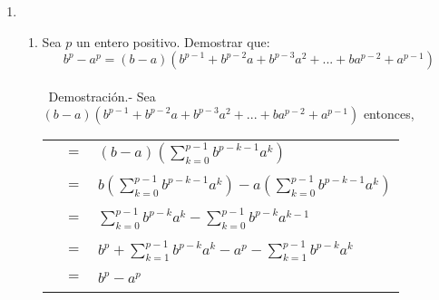 \begin{enumerate}[ \bfseries 1.]
\item 
\begin{enumerate}[\bfseries (a)]
\item Sea $p$ un entero positivo. Demostrar que:
$$b^p - a^p = (b-a)(b^{p-1} + b^{p-2}a + b^{p-3}a^2 + ... + ba^{p-2} + a^{p-1})$$\\\
Demostración.- \; Sea $(b-a)(b^{p-1} + b^{p-2}a + b^{p-3}a^2 + ... + ba^{p-2} + a^{p-1})$ entonces,
\begin{center}
\begin{tabular}{rcl}
&$=$&$(b-a)\left( \sum\limits_{k=0}^{p-1} b^{p-k-1} a^k \right)$\\\\
&$=$&$b \left( \sum\limits_{k=0}^{p-1} b^{p-k-1} a^k \right) - a\left( \sum\limits_{k=0}^{p-1} b^{p-k-1} a^k \right)$\\\\
&$=$&$ \sum\limits_{k=0}^{p-1} b^{p-k} a^k - \sum\limits_{k=0}^{p-1} b^{p-k} a^{k-1}  $\\\\
&$=$&$b^p + \sum\limits_{k=1}^{p-1} b^{p-k}a^k - a^p - \sum\limits_{k=1}^{p-1} b^{p-k}a^k$\\\\
&$=$&$b^p - a^p$\\\\
\end{tabular}
\end{center}


\end{enumerate}
\end{enumerate}
